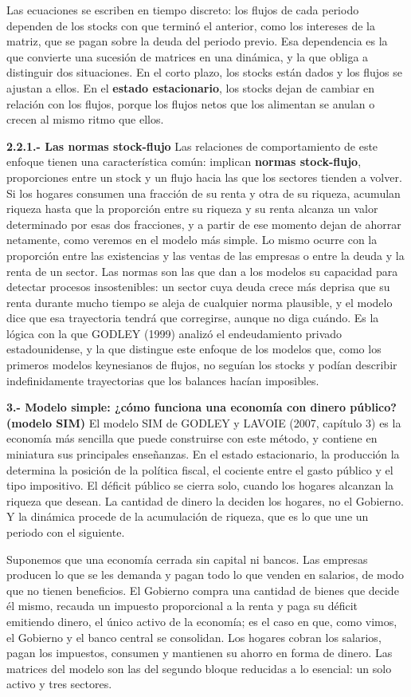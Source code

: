 \documentclass[10pt,a4paper]{article}
\begin{document}
Las ecuaciones se escriben en tiempo discreto: los flujos de cada periodo dependen de los stocks con que terminó el anterior, como los intereses de la matriz, que se pagan sobre la deuda del periodo previo. Esa dependencia es la que convierte una sucesión de matrices en una dinámica, y la que obliga a distinguir dos situaciones. En el corto plazo, los stocks están dados y los flujos se ajustan a ellos. En el \textbf{estado estacionario}, los stocks dejan de cambiar en relación con los flujos, porque los flujos netos que los alimentan se anulan o crecen al mismo ritmo que ellos.

\textbf{2.2.1.- Las normas stock-flujo}
Las relaciones de comportamiento de este enfoque tienen una característica común: implican \textbf{normas stock-flujo}, proporciones entre un stock y un flujo hacia las que los sectores tienden a volver. Si los hogares consumen una fracción de su renta y otra de su riqueza, acumulan riqueza hasta que la proporción entre su riqueza y su renta alcanza un valor determinado por esas dos fracciones, y a partir de ese momento dejan de ahorrar netamente, como veremos en el modelo más simple. Lo mismo ocurre con la proporción entre las existencias y las ventas de las empresas o entre la deuda y la renta de un sector. Las normas son las que dan a los modelos su capacidad para detectar procesos insostenibles: un sector cuya deuda crece más deprisa que su renta durante mucho tiempo se aleja de cualquier norma plausible, y el modelo dice que esa trayectoria tendrá que corregirse, aunque no diga cuándo. Es la lógica con la que GODLEY (1999) analizó el endeudamiento privado estadounidense, y la que distingue este enfoque de los modelos que, como los primeros modelos keynesianos de flujos, no seguían los stocks y podían describir indefinidamente trayectorias que los balances hacían imposibles.

\textbf{3.- Modelo simple: ¿cómo funciona una economía con dinero público? (modelo SIM)}
El modelo SIM de GODLEY y LAVOIE (2007, capítulo 3) es la economía más sencilla que puede construirse con este método, y contiene en miniatura sus principales enseñanzas. En el estado estacionario, la producción la determina la posición de la política fiscal, el cociente entre el gasto público y el tipo impositivo. El déficit público se cierra solo, cuando los hogares alcanzan la riqueza que desean. La cantidad de dinero la deciden los hogares, no el Gobierno. Y la dinámica procede de la acumulación de riqueza, que es lo que une un periodo con el siguiente.

Suponemos que una economía cerrada sin capital ni bancos. Las empresas producen lo que se les demanda y pagan todo lo que venden en salarios, de modo que no tienen beneficios. El Gobierno compra una cantidad de bienes que decide él mismo, recauda un impuesto proporcional a la renta y paga su déficit emitiendo dinero, el único activo de la economía; es el caso en que, como vimos, el Gobierno y el banco central se consolidan. Los hogares cobran los salarios, pagan los impuestos, consumen y mantienen su ahorro en forma de dinero. Las matrices del modelo son las del segundo bloque reducidas a lo esencial: un solo activo y tres sectores.
\end{document}
